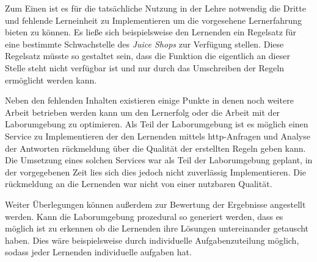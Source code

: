 Zum Einen ist es für die tatsächliche Nutzung in der Lehre notwendig die Dritte und fehlende Lerneinheit zu Implementieren um die vorgesehene Lernerfahrung bieten zu können.
Es ließe sich beispielsweise den Lernenden ein Regelsatz für eine bestimmte Schwachstelle des \textit{Juice Shops} zur Verfügung stellen.
Diese Regelsatz müsste so gestaltet sein, dass die Funktion die eigentlich an dieser Stelle steht nicht verfügbar ist und nur durch das Umschreiben der Regeln ermöglicht werden kann.

Neben den fehlenden Inhalten existieren einige Punkte in denen noch weitere Arbeit betrieben werden kann um den Lernerfolg oder die Arbeit mit der Laborumgebung zu optimieren.
Als Teil der Laborumgebung ist es möglich einen Service zu Implementieren der den Lernenden mittels \ac{http}-Anfragen und Analyse der Antworten rückmeldung über die Qualität der erstellten Regeln geben kann.
Die Umsetzung eines solchen Services war als Teil der Laborumgebung geplant, in der vorgegebenen Zeit lies sich dies jedoch nicht zuverlässig Implementieren.
Die rückmeldung an die Lernenden war nicht von einer nutzbaren Qualität.

Weiter Überlegungen können außerdem zur Bewertung der Ergebnisse angestellt werden.
Kann die Laborumgebung prozedural so generiert werden, dass es möglich ist zu erkennen ob die Lernenden ihre Lösungen untereinander getauscht haben.
Dies wäre beispielsweise durch individuelle Aufgabenzuteilung möglich, sodass jeder Lernenden individuelle aufgaben hat.

